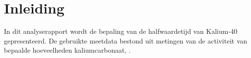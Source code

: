 \documentclass[11pt,a4paper]{article}
\begin{document}
\suppressfloats[t]      %


\section{Inleiding}
In dit analyserapport wordt de bepaling van de halfwaardetijd van Kalium-40 gepresenteerd. De gebruikte meetdata bestond uit metingen van de activiteit van bepaalde hoeveelheden kaliumcarbonaat, .

%
%
%
\end{document}
